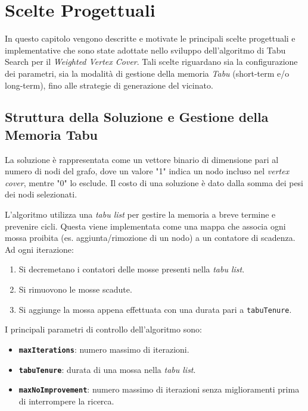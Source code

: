 \section{Scelte Progettuali}
\label{sec:ScelteProgettuali}

In questo capitolo vengono descritte e motivate le principali scelte progettuali e implementative che sono state adottate nello sviluppo dell'algoritmo di Tabu Search per il \emph{Weighted Vertex Cover}. Tali scelte riguardano sia la configurazione dei parametri, sia la modalità di gestione della memoria \emph{Tabu} (short-term e/o long-term), fino alle strategie di generazione del vicinato.

\subsection{Struttura della Soluzione e Gestione della Memoria Tabu}

La soluzione è rappresentata come un vettore binario di dimensione pari al numero di nodi del grafo, dove un valore "1" indica un nodo incluso nel \textit{vertex cover}, mentre "0" lo esclude. Il costo di una soluzione è dato dalla somma dei pesi dei nodi selezionati.

L'algoritmo utilizza una \textit{tabu list} per gestire la memoria a breve termine e prevenire cicli. Questa viene implementata come una mappa che associa ogni mossa proibita (es. aggiunta/rimozione di un nodo) a un contatore di scadenza. Ad ogni iterazione:
\begin{enumerate}
    \item Si decremetano i contatori delle mosse presenti nella \textit{tabu list}.
    \item Si rimuovono le mosse scadute.
    \item Si aggiunge la mossa appena effettuata con una durata pari a \texttt{tabuTenure}.
\end{enumerate}

I principali parametri di controllo dell'algoritmo sono:
\begin{itemize}
    \item \textbf{\texttt{maxIterations}}: numero massimo di iterazioni.
    \item \textbf{\texttt{tabuTenure}}: durata di una mossa nella \textit{tabu list}.
    \item \textbf{\texttt{maxNoImprovement}}: numero massimo di iterazioni senza miglioramenti prima di interrompere la ricerca.
\end{itemize}

